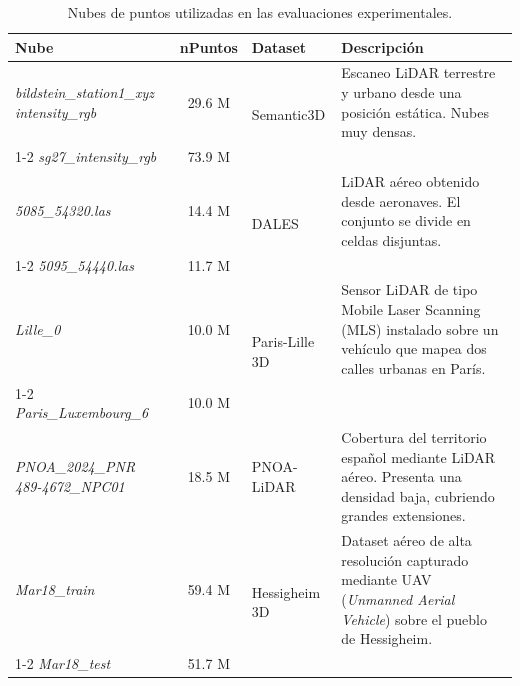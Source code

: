 \begin{table}[htbp]
\centering 
\renewcommand{\tabularxcolumn}[1]{m{#1}}

\begin{tabularx}{\textwidth}{|p{3.5cm}|c|p{2.8cm}|X|} \hline
\textbf{Nube} & \textbf{nPuntos} & \textbf{Dataset} & \textbf{Descripción} \\ \hline

\textit{bildstein\_station1\_xyz intensity\_rgb} & 29.6 M & \multirow{2}{2.8cm}{Semantic3D \cite{cloud_semantic}} & Escaneo LiDAR terrestre y urbano desde una posición estática. Nubes muy densas. \\ \cline{1-2}
\textit{sg27\_intensity\_rgb} & 73.9 M & & \\ \hline

\textit{5085\_54320.las} & 14.4 M & \multirow{2}{2.8cm}{DALES \cite{cloud_dales}} & LiDAR aéreo obtenido desde aeronaves. El conjunto se divide en celdas disjuntas. \\ \cline{1-2}
\textit{5095\_54440.las} & 11.7 M & & \\ \hline

\textit{Lille\_0} & 10.0 M & \multirow{2}{2.8cm}{Paris-Lille 3D \cite{cloud_paris}} & Sensor LiDAR de tipo Mobile Laser Scanning (MLS) instalado sobre un vehículo que mapea dos calles urbanas en París. \\ \cline{1-2}
\textit{Paris\_Luxembourg\_6} & 10.0 M & & \\ \hline

\textit{PNOA\_2024\_PNR 489-4672\_NPC01} & 18.5 M & PNOA-LiDAR \cite{cloud_pnoa} & Cobertura del territorio español mediante LiDAR aéreo. Presenta una densidad baja, cubriendo grandes extensiones. \\ \hline

\textit{Mar18\_train} & 59.4 M & \multirow{2}{2.8cm}{Hessigheim 3D \cite{cloud_hess}} & Dataset aéreo de alta resolución capturado mediante UAV (\textit{Unmanned Aerial Vehicle}) sobre el pueblo de Hessigheim. \\ \cline{1-2}
\textit{Mar18\_test} & 51.7 M & & \\ \hline
\end{tabularx}
\caption{Nubes de puntos utilizadas en las evaluaciones experimentales.}
\label{tab:nubes_evaluacion}
\end{table}
